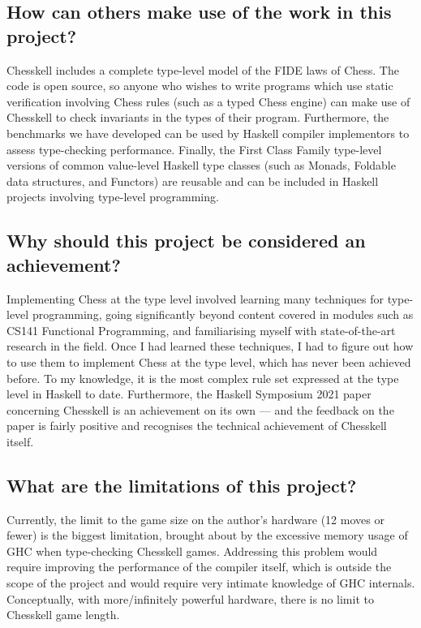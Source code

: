 \subsection{How can others make use of the work in this project?}

Chesskell includes a complete type-level model of the FIDE laws of Chess. The code is open source, so anyone who wishes to write programs which use static verification involving Chess rules (such as a typed Chess engine) can make use of Chesskell to check invariants in the types of their program. Furthermore, the benchmarks we have developed can be used by Haskell compiler implementors to assess type-checking performance. Finally, the First Class Family type-level versions of common value-level Haskell type classes (such as Monads, Foldable data structures, and Functors) are reusable and can be included in Haskell projects involving type-level programming.

\subsection{Why should this project be considered an achievement?}

Implementing Chess at the type level involved learning many techniques for type-level programming, going significantly beyond content covered in modules such as CS141 Functional Programming, and familiarising myself with state-of-the-art research in the field. Once I had learned these techniques, I had to figure out how to use them to implement Chess at the type level, which has never been achieved before. To my knowledge, it is the most complex rule set expressed at the type level in Haskell to date. Furthermore, the Haskell Symposium 2021 paper concerning Chesskell is an achievement on its own --- and the feedback on the paper is fairly positive and recognises the technical achievement of Chesskell itself.

\subsection{What are the limitations of this project?}

Currently, the limit to the game size on the author's hardware (12 moves or fewer) is the biggest limitation, brought about by the excessive memory usage of GHC when type-checking Chesskell games. Addressing this problem would require improving the performance of the compiler itself, which is outside the scope of the project and would require very intimate knowledge of GHC internals. Conceptually, with more/infinitely powerful hardware, there is no limit to Chesskell game length.
